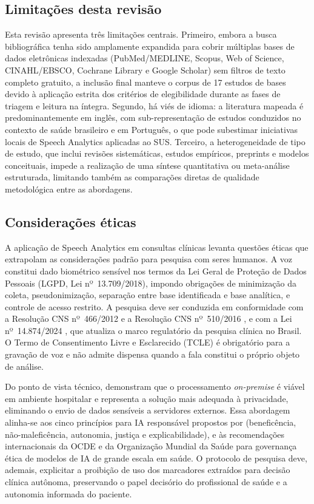 \documentclass[a4paper,fleqn]{cas-sc}
\begin{document}
\subsection*{Limitações desta revisão}

Esta revisão apresenta três limitações centrais.
Primeiro, embora a busca bibliográfica tenha sido amplamente expandida para cobrir múltiplas bases de dados eletrônicas indexadas (PubMed/MEDLINE, Scopus, Web of Science, CINAHL/EBSCO, Cochrane Library e Google Scholar) sem filtros de texto completo gratuito, a inclusão final manteve o corpus de 17 estudos de bases devido à aplicação estrita dos critérios de elegibilidade durante as fases de triagem e leitura na íntegra.
Segundo, há viés de idioma: a literatura mapeada é predominantemente em inglês, com sub-representação de estudos conduzidos no contexto de saúde brasileiro e em Português, o que pode subestimar iniciativas locais de Speech Analytics aplicadas ao SUS.
Terceiro, a heterogeneidade de tipo de estudo, que inclui revisões sistemáticas, estudos empíricos, preprints e modelos conceituais, impede a realização de uma síntese quantitativa ou meta-análise estruturada, limitando também as comparações diretas de qualidade metodológica entre as abordagens.

\subsection*{Considerações éticas}

A aplicação de Speech Analytics em consultas clínicas levanta questões
éticas que extrapolam as considerações padrão para pesquisa com seres
humanos.
A voz constitui dado biométrico sensível nos termos da Lei Geral de
Proteção de Dados Pessoais (LGPD, Lei nº~13.709/2018), impondo obrigações
de minimização da coleta, pseudonimização, separação entre base identificada
e base analítica, e controle de acesso restrito.
A pesquisa deve ser conduzida em conformidade com a Resolução
CNS nº~466/2012 \citep{CNS466_2012} e a Resolução CNS nº~510/2016
\citep{CNS510_2016}, e com a Lei nº~14.874/2024 \citep{Lei14874_2024},
que atualiza o marco regulatório da pesquisa clínica no Brasil.
O Termo de Consentimento Livre e Esclarecido (TCLE) é obrigatório
para a gravação de voz e não admite dispensa quando a fala constitui o
próprio objeto de análise.

Do ponto de vista técnico, \citet{Klusty2025}
demonstram que o processamento \emph{on-premise} é viável em ambiente
hospitalar e representa a solução mais adequada à privacidade, eliminando
o envio de dados sensíveis a servidores externos.
Essa abordagem alinha-se aos cinco princípios para IA responsável
propostos por \citet{Floridi2018} (beneficência,
não-maleficência, autonomia, justiça e explicabilidade), e às
recomendações internacionais da OCDE \citep{OECD2024} e da
Organização Mundial da Saúde \citep{WHO2024} para governança ética de
modelos de IA de grande escala em saúde.
O protocolo de pesquisa deve, ademais, explicitar a proibição de uso
dos marcadores extraídos para decisão clínica autônoma, preservando o
papel decisório do profissional de saúde e a autonomia informada do
paciente.
\end{document}

